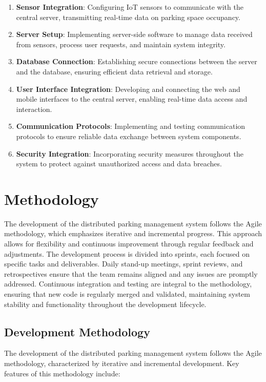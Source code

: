\documentclass[oneside, 12pt, a4paper, draft]{book}
\begin{document}
\begin{enumerate}
\item \textbf{\textbf{Sensor Integration}}: Configuring IoT sensors to communicate with the central server, transmitting real-time data on parking space occupancy.
\item \textbf{\textbf{Server Setup}}: Implementing server-side software to manage data received from sensors, process user requests, and maintain system integrity.
\item \textbf{\textbf{Database Connection}}: Establishing secure connections between the server and the database, ensuring efficient data retrieval and storage.
\item \textbf{\textbf{User Interface Integration}}: Developing and connecting the web and mobile interfaces to the central server, enabling real-time data access and interaction.
\item \textbf{\textbf{Communication Protocols}}: Implementing and testing communication protocols to ensure reliable data exchange between system components.
\item \textbf{\textbf{Security Integration}}: Incorporating security measures throughout the system to protect against unauthorized access and data breaches.
\end{enumerate}
\chapter{Methodology}
\label{sec:org71de2d9}
The development of the distributed parking management system follows the Agile methodology, which emphasizes iterative and incremental progress. This approach allows for flexibility and continuous improvement through regular feedback and adjustments. The development process is divided into sprints, each focused on specific tasks and deliverables. Daily stand-up meetings, sprint reviews, and retrospectives ensure that the team remains aligned and any issues are promptly addressed. Continuous integration and testing are integral to the methodology, ensuring that new code is regularly merged and validated, maintaining system stability and functionality throughout the development lifecycle.
\section{Development Methodology}
\label{sec:org9030bc3}
The development of the distributed parking management system follows the Agile methodology, characterized by iterative and incremental development. Key features of this methodology include:
\end{document}
